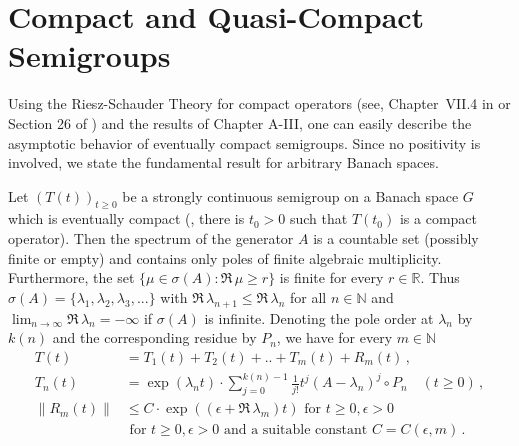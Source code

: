 \section{Compact and Quasi-Compact Semigroups}
\hspace{1cm}{\Large by Günther Greiner}
\vspace{.5cm}
\newline
Using the Riesz-Schauder Theory for compact operators (see, \eg
Chapter~VII.4 in \citet{dunfordschwartz:1958} or Section 26 of \citet{pietsch:1978}) and the results of Chapter A-III, one can easily describe the
asymptotic behavior of eventually compact semigroups.
Since no positivity is involved, we state the fundamental result for arbitrary Banach
spaces.

\begin{theorem}\label{thm:b4-2.1}
	Let $(T(t))_{t \geq 0}$ be a strongly continuous semigroup on a
	Banach space $G$ which is eventually compact (\ie, there is $t_{0} > 0$
	such that $T(t_{0})$ is a compact operator).
	Then the spectrum of the
	generator $A$ is a countable set (possibly finite or empty) and
	contains only poles of finite algebraic multiplicity.
	Furthermore,
	the set $\{\mu \in \sigma(A) \colon \Re\,\mu \geq r\}$ is finite for every $r \in \mathbb{R}$.
	Thus
	$\sigma(A) = \{\lambda_1,\lambda_2,\lambda_3,... \}$ with $\Re\,\lambda_{n+1} \leq \Re\,\lambda_n$ for all $n \in \mathbb{N}$ and
	$\lim_{n \to \infty} \Re\,\lambda_n = -\infty$ if $\sigma(A)$ is infinite.
	Denoting the pole order at $\lambda_n$ by $k(n)$ and the corresponding residue
	by $P_n$, we have for every $m \in \mathbb{N}$
	\begin{equation}\label{eq:b4-2.1}
		\begin{aligned}
			T(t) &= T_1(t) + T_2(t) + .. + T_m(t) + R_m(t)\,,\\
			T_n(t) &= \exp(\lambda_n t) \cdot \sum_{j=0}^{k(n)-1} \frac{1}{j!}t^j(A - \lambda_n)^j \circ P_n \quad (t \geq 0)\,,\\
			\|R_m(t)\| & \leq C \cdot \exp((\epsilon +\Re\, \lambda_m)t) \text{ for }  t \geq 0, \epsilon >0\\
			&  \text{ for }  t \geq 0, \epsilon >0  \text{ and a suitable	constant } C=C(\epsilon ,m)\,.
		\end{aligned}
	\end{equation}
\end{theorem}
